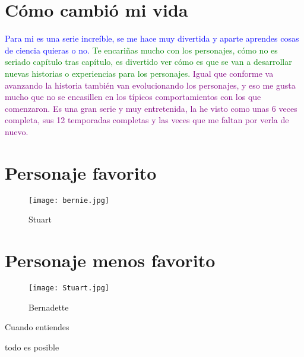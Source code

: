 \documentclass[a5paper, 11pt]{article}
\begin{document}
\section{Cómo cambió mi vida}

\textcolor{blue}{Para mi es una serie increíble, se me hace muy divertida y aparte aprendes cosas de ciencia quieras o no.}
\textcolor{green}{Te encariñas mucho con los personajes, cómo no es seriado capítulo tras capítulo, es divertido ver cómo es que se van a desarrollar nuevas historias o experiencias para los personajes.} 
\textcolor{purple}{Igual que conforme va avanzando la historia también van evolucionando los personajes, y eso me gusta mucho que no se encasillen en los típicos comportamientos con los que comenzaron. Es una gran serie y muy entretenida, la he visto como unas 6 veces completa, sus 12 temporadas completas y las veces que me faltan por verla de nuevo.}

\section{Personaje favorito}
\begin{figure}[H]
    \raggedleft
    \caption{Stuart}
    \texttt{[image: bernie.jpg]}
    \label{fig:my_label}
\end{figure}

\section{Personaje menos favorito}
\begin{figure}[H]
    \raggedleft
    \caption{Bernadette}
    \texttt{[image: Stuart.jpg]}
    \label{fig:my_label}
\end{figure}


Cuando entiendes
\space{}


todo es posible
\end{document}
